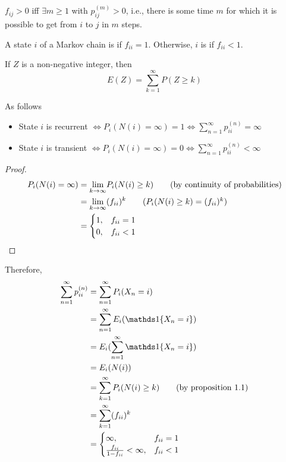 \documentclass[11pt]{article}
\newcommand{\limit}[1]{\underset{{#1} \rightarrow \infty}{\lim}}
\newcommand{\dur}[3]{{#1}_{#2}^{({#3})}}
\begin{document}
    \fact
    $f_{ij} > 0$ iff $\exists m \geq 1$ with $\dur{p}{ij}{m} > 0$, i.e., there is some time $m$ for which it is possible to get from $i$ to $j$ in $m$ steps.
    
    A state $i$ of a Markov chain is  if $f_{ii} = 1$. Otherwise, $i$ is  if $f_{ii} < 1$.
    
    \proposition
    If $Z$ is a non-negative integer, then
    $$E(Z) = \sum_{k=1}^\infty P(Z \geq k)$$
    
     As follows
    \begin{itemize}
    	\item  State $i$ is recurrent $\iff P_i(N(i) = \infty) = 1 \iff \sum_{n=1}^\infty p_{ii}^{(n)} = \infty$
    	\item State $i$ is transient $\iff P_i(N(i) = \infty) = 0 \iff \sum_{n=1}^\infty p_{ii}^{(n)} < \infty$ 
    \end{itemize}
    \begin{proof}
    	\begin{align*}
    		P_i(N(i) = \infty) &= \limit{k} P_i(N(i) \geq k) \tag{by continuity of probabilities} \\
    		&= \limit{k} (f_{ii})^k \tag{$P_i(N(i) \geq k) = (f_{ii})^k$}\\
    		&= \begin{cases}
    			1, & f_{ii} = 1 \\
    			0, & f_{ii} < 1
    		\end{cases}
    	\end{align*}
    \end{proof}
    Therefore,
    \begin{align*}
    	\sum_{n=1}^\infty \dur{p}{ii}{n} &= \sum_{n=1}^\infty P_i(X_n = i) \\ 
    	&= \sum_{n=1}^\infty E_i(\id{X_n = i}) \\
    	&= E_i(\sum_{n=1}^\infty \id{X_n = i}) \\
    	&= E_i(N(i)) \\
    	&= \sum_{k=1}^\infty P_i(N(i) \geq k) \tag{by proposition 1.1}\\
    	&= \sum_{k=1}^\infty (f_{ii})^k \\
    	&= \begin{cases}
    		\infty, & f_{ii} = 1\\
    		\frac{f_{ii}}{1 - f_{ii}} < \infty, & f_{ii} < 1
    	\end{cases}
    \end{align*}
    
\end{document}
